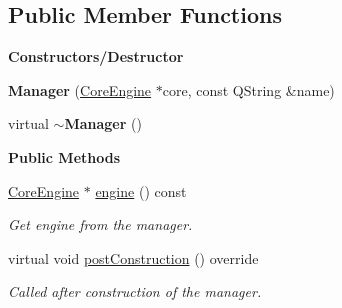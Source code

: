 \subsection*{Public Member Functions}
\begin{Indent}\textbf{ Constructors/\+Destructor}\par
\begin{DoxyCompactItemize}
\item 
\mbox{\label{classrev_1_1_manager_ac027eb508d344bb74b15ad64f983306e}} 
{\bfseries Manager} (\mbox{\hyperlink{classrev_1_1_core_engine}{Core\+Engine}} $\ast$core, const Q\+String \&name)
\item 
\mbox{\label{classrev_1_1_manager_a96b6daea26ca2d94fddd74e40b4dd4a8}} 
virtual {\bfseries $\sim$\+Manager} ()
\end{DoxyCompactItemize}
\end{Indent}
\begin{Indent}\textbf{ Public Methods}\par
\begin{DoxyCompactItemize}
\item 
\mbox{\label{classrev_1_1_manager_a0fbd0df6b4f3caf42b557f9702f48171}} 
\mbox{\hyperlink{classrev_1_1_core_engine}{Core\+Engine}} $\ast$ \mbox{\hyperlink{classrev_1_1_manager_a0fbd0df6b4f3caf42b557f9702f48171}{engine}} () const
\begin{DoxyCompactList}\small\item\em Get engine from the manager. \end{DoxyCompactList}\item 
\mbox{\label{classrev_1_1_manager_ace17f455b4762c5a6b16092b43a939b8}} 
virtual void \mbox{\hyperlink{classrev_1_1_manager_ace17f455b4762c5a6b16092b43a939b8}{post\+Construction}} () override
\begin{DoxyCompactList}\small\item\em Called after construction of the manager. \end{DoxyCompactList}\end{DoxyCompactItemize}
\end{Indent}
